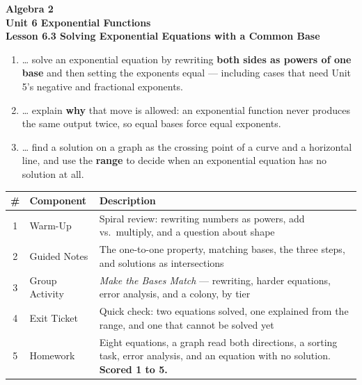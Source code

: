 \documentclass[10pt]{article}
\begin{document}
\vspace{-0.8in}

\begin{center}
  {\color{white}\textbf{\LARGE Algebra 2}}\\[4pt]
  {\color{forestmid}\large\textbf{Unit 6 \quad Exponential Functions}}\\[6pt]
  {\color{white}\textbf{\large Lesson 6.3 \quad Solving Exponential Equations with a Common Base}}
\end{center}

\vspace{0.22in}
\namedateperiod
\vspace{0.18in}

\begin{learningtargetbox}
\small
\begin{enumerate}[leftmargin=1.5em, itemsep=5pt]
  \item \ldots{} solve an exponential equation by rewriting \textbf{both sides as powers of one base} and then setting the exponents equal --- including cases that need Unit 5's negative and fractional exponents.
  \item \ldots{} explain \textbf{why} that move is allowed: an exponential function never produces the same output twice, so equal bases force equal exponents.
  \item \ldots{} find a solution on a graph as the crossing point of a curve and a horizontal line, and use the \textbf{range} to decide when an exponential equation has no solution at all.
\end{enumerate}
\end{learningtargetbox}

\vspace{0.14in}

\begin{tocbox}
\small
\renewcommand{\arraystretch}{1.5}
\begin{tabularx}{\linewidth}{@{} c l X @{}}
\rowcolor{forestbg}
\textbf{\#} & \textbf{Component} & \textbf{Description} \\
\midrule
1 & Warm-Up        & Spiral review: rewriting numbers as powers, add vs.\ multiply, and a question about shape \\
2 & Guided Notes   & The one-to-one property, matching bases, the three steps, and solutions as intersections \\
3 & Group Activity & \emph{Make the Bases Match} --- rewriting, harder equations, error analysis, and a colony, by tier \\
4 & Exit Ticket    & Quick check: two equations solved, one explained from the range, and one that cannot be solved yet \\
5 & Homework       & Eight equations, a graph read both directions, a sorting task, error analysis, and an equation with no solution. \textbf{Scored 1 to 5.} \\
\end{tabularx}
\end{tocbox}
\end{document}
